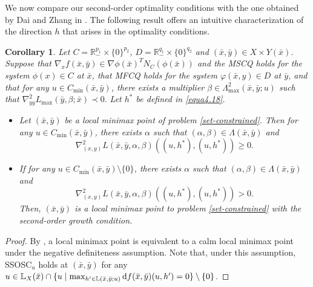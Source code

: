 \documentclass[11pt]{article}
\numberwithin{equation}{section}
\newtheorem{corollary}{Corollary}[section]
\begin{document}
{We now compare our second-order optimality conditions with the one obtained by Dai and Zhang in \cite{DaiZh-2020}. The following result offers an intuitive characterization of the direction $h$ that arises in the optimality conditions.
\begin{corollary}   Let  $C=\mathbb{R}^{p_1}_- \times \{0\}^{p_2}$, $D=\mathbb{R}^{q_1}_- \times \{0\}^{q_2}$ and $(\bar x,\bar y) \in X \times  Y(\bar x)$.  Suppose that $\nabla_x f(\bar x,\bar y) \in \nabla \phi(\bar x)^T N_C(\phi(\bar x))$ and the MSCQ holds for the system $\phi(x)\in C$ at $\bar x$, that { MFCQ holds for the system $\varphi(\bar x,y)\in D$ at $\bar y$, and that for any $u \in C_{\min}(\bar x,\bar y)$, there exists a multiplier $\beta \in \Lambda^2_{\max}(\bar x,\bar y;u)$ such that $\nabla_{yy}^2 L_{\max}(\bar y,\beta;\bar x) \prec 0.$} Let $h^{*}$ be defined in \eqref{equa4.18}.
	\begin{itemize}
		\item[(i)] Let $\left(\bar x,\bar y\right)$ be a local minimax point of problem \eqref{set-constrained}. Then for any $u \in C_{\min}(\bar x,\bar y)$, there exists $\alpha$ such that $(\alpha, \beta)\in \Lambda(\bar x,\bar y)$ and
		\begin{equation}\label{withouthn}
			\nabla^2_{(x,y)} L(\bar x,\bar y,\alpha,\beta)((u,h^*),(u,h^*)) \geq 0.
		\end{equation}
		\item[(ii)] If for any $u \in C_{\min}(\bar x,\bar y) \setminus \{0\}$, there exists $\alpha$ such that $(\alpha, \beta)\in \Lambda(\bar x,\bar y)$ and
		\begin{equation}\label{withouths}
			\nabla^2_{(x,y)} L(\bar x,\bar y,\alpha,\beta)((u,h^*),(u,h^*)) > 0.
		\end{equation}
		Then, $(\bar x,\bar y)$ is a local minimax point to problem \eqref{set-constrained} with the second-order growth condition. 
	\end{itemize}
\end{corollary}
\begin{proof}
By \cite[Lemma 5.1]{Ma2023}, a local minimax point is equivalent to a calm local minimax point under the negative definiteness assumption.  
{ Note that, under this assumption, SSOSC$_u$ holds at $(\bar x,\bar y)$ for any $u \in \mathbb{L}_X(\bar x) \cap \{u \mid \max_{h' \in \mathbb{L}(\bar x,\bar y;u)} {\rm d}f(\bar x,\bar y)(u,h') = 0\} \setminus \{0\}$.}



\end{proof}}
\end{document}
